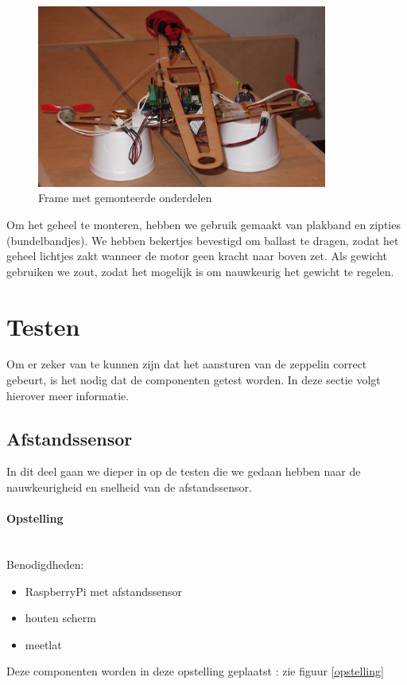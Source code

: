 \documentclass[eind]{penoverslag}
\begin{document}
\begin{figure}[ht!]
\centering
\includegraphics[height=60mm]{zeppelinFrame.jpg}
\caption{Frame met gemonteerde onderdelen}
\label{zeppFrame}
\end{figure}

Om het geheel te monteren, hebben we gebruik gemaakt van plakband en zipties (bundelbandjes). We hebben bekertjes bevestigd om ballast te dragen, zodat het geheel lichtjes zakt wanneer de motor geen kracht naar boven zet. Als gewicht gebruiken we zout, zodat het mogelijk is om nauwkeurig het gewicht te regelen. \\

\section{Testen}

Om er zeker van te kunnen zijn dat het aansturen van de zeppelin correct gebeurt, is het nodig dat de componenten getest worden. In deze sectie volgt hierover meer informatie. \\
\subsection{Afstandssensor}

In dit deel gaan we dieper in op de testen die we gedaan hebben naar de nauwkeurigheid en snelheid van de afstandssensor.

\paragraph{Opstelling} ~\\ 
Benodigdheden:
\begin{itemize}
	\item RaspberryPi met afstandssensor
	\item houten scherm
	\item meetlat
\end{itemize}
Deze componenten worden in deze opstelling geplaatst : zie figuur \ref{opstelling}
\end{document}

